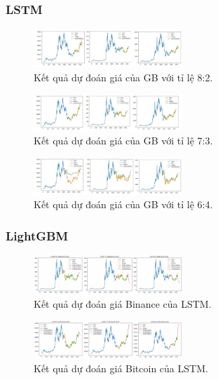 \documentclass[conference]{IEEEtran}
\begin{document}
\subsubsection{LSTM}

\begin{figure}[H]
    \centering
    \includegraphics[width=0.5\textwidth]{bibliography/pictures/GB_82.jpg}
    \caption{Kết quả dự đoán giá của GB với tỉ lệ 8:2.}
\end{figure}
\begin{figure}[H]
    \centering
    \includegraphics[width=0.5\textwidth]{bibliography/pictures/GB_73.jpg}
    \caption{Kết quả dự đoán giá của GB với tỉ lệ 7:3.}
\end{figure}
\begin{figure}[H]
    \centering
    \includegraphics[width=0.5\textwidth]{bibliography/pictures/GB_64.jpg}
    \caption{Kết quả dự đoán giá của GB với tỉ lệ 6:4.}
\end{figure}



\subsubsection{LightGBM}

\begin{figure}[H]
    \centering
    \includegraphics[width=0.5\textwidth]{bibliography/pictures/LSTM BNB.jpg}
    \caption{Kết quả dự đoán giá Binance của LSTM.}
\end{figure}

\begin{figure}[H]
    \centering
    \includegraphics[width=0.5\textwidth]{bibliography/pictures/LSTM BTC.jpg}
    \caption{Kết quả dự đoán giá Bitcoin của LSTM.}
\end{figure}
\end{document}
